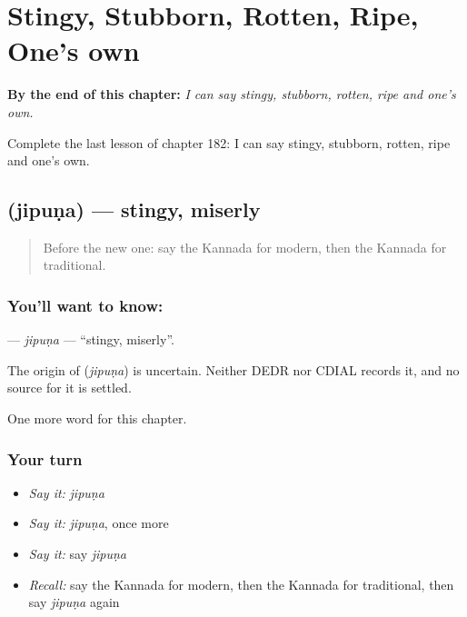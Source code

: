 
\chapter{Stingy, Stubborn, Rotten, Ripe, One's own}
\label{ch:ka-stingy-stubborn-rotten-ripe-one-s-own}

\begin{chapteropening}
\textbf{By the end of this chapter:} \emph{I can say stingy, stubborn, rotten, ripe and one's own.}

Complete the last lesson of chapter 182: I can say stingy, stubborn, rotten, ripe and one's own.
\end{chapteropening}

\section[\texorpdfstring{\kn{ಜಿಪುಣ} (jipuṇa)}{ಜಿಪುಣ (jipuṇa)}]{ (jipuṇa) — stingy, miserly}

\label{lesson:KA-C182-jipuna}



\begin{quote}
Before the new one: say the Kannada for modern, then the Kannada for traditional.
\end{quote}

\subsection*{You'll want to know: }
\textbf{} — \emph{jipuṇa} — \textquotedblleft{}stingy, miserly\textquotedblright{}.

\begin{cousinweb}
The origin of \textbf{} (\emph{jipuṇa}) is uncertain. Neither DEDR nor CDIAL records it, and no source for it is settled.
\end{cousinweb}

\begin{grammarlens}[title={What you've built}]
One more word for this chapter.
\end{grammarlens}

\subsection*{Your turn}
\begin{itemize}
\raggedright
  \item \emph{Say it:} \emph{jipuṇa}
  \item \emph{Say it:} \emph{jipuṇa}, once more
  \item \emph{Say it:} say \emph{jipuṇa}
  \item \emph{Recall:} say the Kannada for modern, then the Kannada for traditional, then say \emph{jipuṇa} again
\end{itemize}

